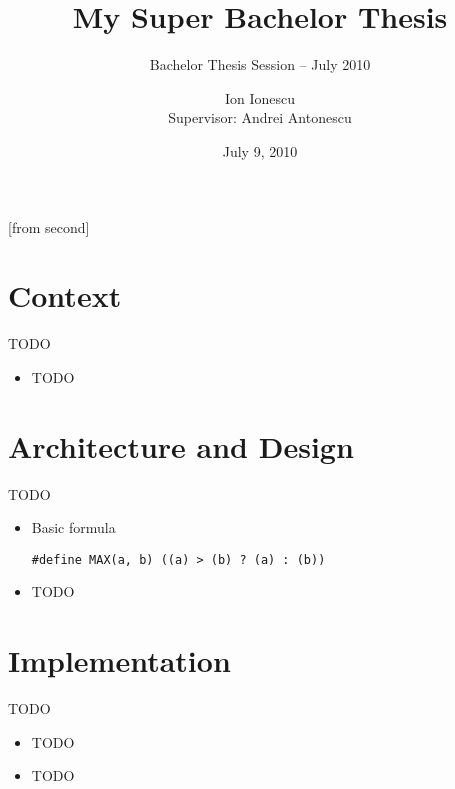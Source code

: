 \documentclass{beamer}
\title[My Super Bachelor Thesis]{My Super Bachelor Thesis}
\subtitle{Bachelor Thesis Session -- July 2010}
\institute{Automatic Control and Computers Faculty,\\
	University ``Politehnica'' of Bucharest}
\author[Ion Ionescu]{Ion Ionescu\\
	Supervisor: Andrei Antonescu}
\date{July 9, 2010}
\begin{document}
[from second]


\frame{\titlepage}

\frame{\tableofcontents}

\section{Context}

\begin{frame}{TODO}
	\begin{itemize}		%
		\item TODO
	\end{itemize}
\end{frame}

\section{Architecture and Design}

\begin{frame}{TODO}
	\begin{itemize}
		\item Basic formula
			\begin{beamerboxesrounded}[lower=block body,shadow=true]{}
				\texttt{\#define MAX(a, b)   ((a) > (b) ? (a) : (b))}
			\end{beamerboxesrounded}
		\item TODO
	\end{itemize}
\end{frame}

\section{Implementation}

\begin{frame}{TODO}
	\begin{itemize}
		\item TODO
		\item TODO
	\end{itemize}
\end{frame}
\end{document}
